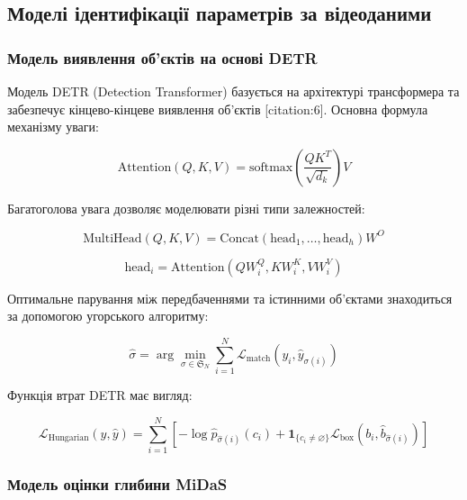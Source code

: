 \documentclass[14pt, a4paper]{extarticle}
\numberwithin{equation}{section}
\begin{document}
\subsection{Моделі ідентифікації параметрів за відеоданими}

\subsubsection{Модель виявлення об'єктів на основі DETR}

Модель DETR (Detection Transformer) базується на архітектурі трансформера та забезпечує кінцево-кінцеве виявлення об'єктів [citation:6]. Основна формула механізму уваги:

\begin{equation}
\boxed{\text{Attention}(Q, K, V) = \text{softmax}\left(\frac{QK^T}{\sqrt{d_k}}\right)V} \tag{7}
\end{equation}

Багатоголова увага дозволяє моделювати різні типи залежностей:

\begin{equation}
\boxed{\text{MultiHead}(Q, K, V) = \text{Concat}(\text{head}_1, \ldots, \text{head}_h) W^O} \tag{8}
\end{equation}

\begin{equation}
\text{head}_i = \text{Attention}(QW_i^Q, KW_i^K, VW_i^V) \tag{9}
\end{equation}

Оптимальне парування між передбаченнями та істинними об'єктами знаходиться за допомогою угорського алгоритму:

\begin{equation}
\hat{\sigma} = \arg\min_{\sigma \in \mathfrak{S}_N} \sum_{i=1}^N \mathcal{L}_{\text{match}}(y_i, \hat{y}_{\sigma(i)}) \tag{10}
\end{equation}

Функція втрат DETR має вигляд:

\begin{equation}
\boxed{\mathcal{L}_{\text{Hungarian}}(y, \hat{y}) = \sum_{i=1}^N \left[ -\log \hat{p}_{\hat{\sigma}(i)}(c_i) + \mathbf{1}_{\{c_i \neq \varnothing\}} \mathcal{L}_{\text{box}}(b_i, \hat{b}_{\hat{\sigma}(i)}) \right]} \tag{11}
\end{equation}

\subsubsection{Модель оцінки глибини MiDaS}
\end{document}
